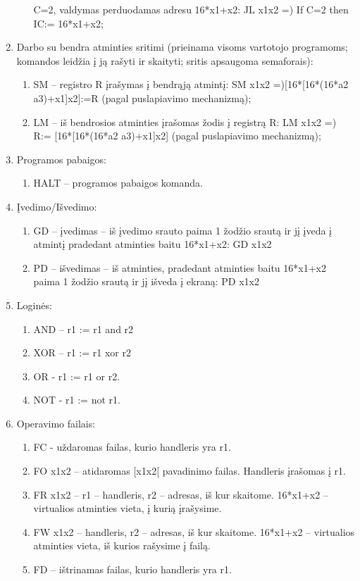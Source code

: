 \documentclass[oneside]{VUMIFPSkursinis}
\begin{document}
\begin{enumerate}
\begin{enumerate}
C=2, valdymas perduodamas adresu 16*x1+x2:
JL x1x2 =) If C=2 then IC:= 16*x1+x2;
\end{enumerate}
\item Darbo su bendra atminties sritimi (prieinama visoms vartotojo programoms; komandos
leidžia į ją rašyti ir skaityti; sritis apsaugoma semaforais):
\begin{enumerate}
\item SM – registro R įrašymas į bendrąją atmintį:
SM x1x2 =)[16*[16*(16*a2 a3)+x1]x2]:=R (pagal puslapiavimo mechanizmą);
\item LM – iš bendrosios atminties įrašomas žodis į registrą R:
LM x1x2 =) R:= [16*[16*(16*a2 a3)+x1]x2] (pagal puslapiavimo mechanizmą);
\end{enumerate}
\item Programos pabaigos:
\begin{enumerate}
\item HALT – programos pabaigos komanda.
\end{enumerate}
\item Įvedimo/Išvedimo:
\begin{enumerate}
\item GD – įvedimas – iš įvedimo srauto paima 1 žodžio srautą ir jį įveda į atmintį
pradedant atminties baitu 16*x1+x2:
GD x1x2
\item PD – išvedimas – iš atminties, pradedant atminties baitu 16*x1+x2 paima 1 žodžio
srautą ir jį išveda į ekraną:
PD x1x2
\end{enumerate}
\item Loginės:
\begin{enumerate}
\item AND – r1 := r1 and r2
\item XOR – r1 := r1 xor r2
\item OR - r1 := r1 or r2.
\item NOT - r1 := not r1.
\end{enumerate}
\item Operavimo failais:
\begin{enumerate}
\item FC - uždaromas failas, kurio handleris yra r1.
\item FO x1x2 – atidaromas [x1x2[ pavadinimo failas. Handleris įrašomas į r1.
\item FR x1x2 – r1 – handleris, r2 – adresas, iš kur skaitome. 16*x1+x2 – virtualios atminties
vieta, į kurią įrašysime.
\item FW x1x2 – handleris, r2 – adresas, iš kur skaitome. 16*x1+x2 – virtualios atminties
vieta, iš kurios rašysime į failą.
\item FD – ištrinamas failas, kurio handleris yra r1.
\end{enumerate}
\end{enumerate}
\end{document}

